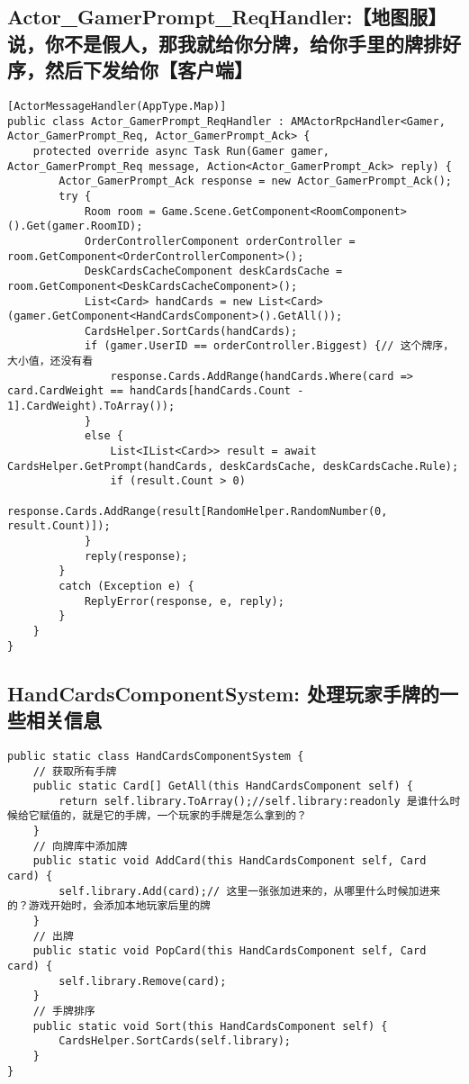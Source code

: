 \documentclass[9pt, b5paper]{article}
\begin{document}
\subsection{Actor\_GamerPrompt\_ReqHandler:【地图服】说，你不是假人，那我就给你分牌，给你手里的牌排好序，然后下发给你【客户端】}
\label{sec-2-2}
\begin{verbatim}
[ActorMessageHandler(AppType.Map)]
public class Actor_GamerPrompt_ReqHandler : AMActorRpcHandler<Gamer, Actor_GamerPrompt_Req, Actor_GamerPrompt_Ack> {
    protected override async Task Run(Gamer gamer, Actor_GamerPrompt_Req message, Action<Actor_GamerPrompt_Ack> reply) {
        Actor_GamerPrompt_Ack response = new Actor_GamerPrompt_Ack();
        try {
            Room room = Game.Scene.GetComponent<RoomComponent>().Get(gamer.RoomID);
            OrderControllerComponent orderController = room.GetComponent<OrderControllerComponent>();
            DeskCardsCacheComponent deskCardsCache = room.GetComponent<DeskCardsCacheComponent>();
            List<Card> handCards = new List<Card>(gamer.GetComponent<HandCardsComponent>().GetAll());
            CardsHelper.SortCards(handCards);
            if (gamer.UserID == orderController.Biggest) {// 这个牌序，大小值，还没有看
                response.Cards.AddRange(handCards.Where(card => card.CardWeight == handCards[handCards.Count - 1].CardWeight).ToArray());
            }
            else {
                List<IList<Card>> result = await CardsHelper.GetPrompt(handCards, deskCardsCache, deskCardsCache.Rule);
                if (result.Count > 0) 
                    response.Cards.AddRange(result[RandomHelper.RandomNumber(0, result.Count)]);
            }
            reply(response);
        }
        catch (Exception e) {
            ReplyError(response, e, reply);
        }
    }
}
\end{verbatim}
\subsection{HandCardsComponentSystem: 处理玩家手牌的一些相关信息}
\label{sec-2-3}
\begin{verbatim}
public static class HandCardsComponentSystem {
    // 获取所有手牌
    public static Card[] GetAll(this HandCardsComponent self) {
        return self.library.ToArray();//self.library:readonly 是谁什么时候给它赋值的，就是它的手牌，一个玩家的手牌是怎么拿到的？
    }
    // 向牌库中添加牌
    public static void AddCard(this HandCardsComponent self, Card card) {
        self.library.Add(card);// 这里一张张加进来的，从哪里什么时候加进来的？游戏开始时，会添加本地玩家后里的牌
    }
    // 出牌
    public static void PopCard(this HandCardsComponent self, Card card) {
        self.library.Remove(card);
    }
    // 手牌排序
    public static void Sort(this HandCardsComponent self) {
        CardsHelper.SortCards(self.library);
    }
}
\end{verbatim}
\end{document}

